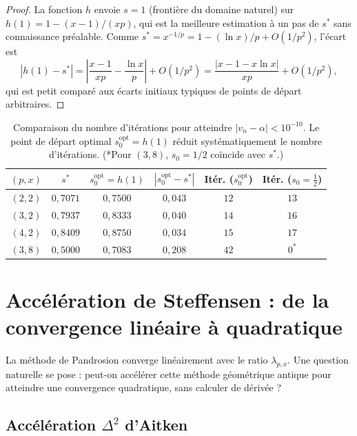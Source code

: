 \documentclass[11pt,a4paper]{article}
\theoremstyle{definition}
\begin{document}
\begin{proof}
La fonction $h$ envoie $s = 1$ (frontière du domaine naturel) sur $h(1) = 1 - (x-1)/(xp)$, qui est la meilleure estimation à un pas de $s^*$ sans connaissance préalable. Comme $s^* = x^{-1/p} = 1 - (\ln x)/p + O(1/p^2)$, l'écart est
\[
  |h(1) - s^*| = \left|\frac{x-1}{xp} - \frac{\ln x}{p}\right| + O(1/p^2) = \frac{|x - 1 - x\ln x|}{xp} + O(1/p^2),
\]
qui est petit comparé aux écarts initiaux typiques de points de départ arbitraires.
\end{proof}

\begin{table}[h]
\centering
\begin{tabular}{cccccc}
\toprule
$(p,x)$ & $s^*$ & $s_0^{\mathrm{opt}} = h(1)$ & $|s_0^{\mathrm{opt}} - s^*|$ & Itér. ($s_0^{\mathrm{opt}}$) & Itér. ($s_0 = \tfrac{1}{2}$) \\
\midrule
$(2,2)$ & $0{,}7071$ & $0{,}7500$ & $0{,}043$ & $12$ & $13$ \\
$(3,2)$ & $0{,}7937$ & $0{,}8333$ & $0{,}040$ & $14$ & $16$ \\
$(4,2)$ & $0{,}8409$ & $0{,}8750$ & $0{,}034$ & $15$ & $17$ \\
$(3,8)$ & $0{,}5000$ & $0{,}7083$ & $0{,}208$ & $42$ & $0^*$ \\
\bottomrule
\end{tabular}
\caption{Comparaison du nombre d'itérations pour atteindre $|v_n - \alpha| < 10^{-10}$. Le point de départ optimal $s_0^{\mathrm{opt}} = h(1)$ réduit systématiquement le nombre d'itérations. (*Pour $(3,8)$, $s_0 = 1/2$ coïncide avec $s^*$.)}
\end{table}

\section{Accélération de Steffensen : de la convergence linéaire à quadratique}
\label{sec:steffensen}

La méthode de Pandrosion converge linéairement avec le ratio $\lambda_{p,x}$. Une question naturelle se pose : peut-on accélérer cette méthode géométrique antique pour atteindre une convergence quadratique, sans calculer de dérivée ?

\subsection{Accélération \texorpdfstring{$\Delta^2$}{Delta-carré} d'Aitken}
\end{document}

